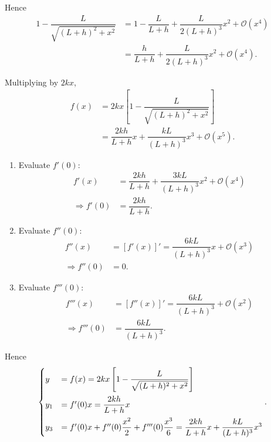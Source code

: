 \documentclass[12pt, a4paper]{report}
\begin{document}
	Hence
	\begin{align*}
		1 - \dfrac{L}{\sqrt{(L + h)^2 + x^2}} &= 1 - \dfrac{L}{L + h} + \dfrac{L}{2(L + h)^3}x^2 + \mathcal{O}(x^4) \\
		&= \dfrac{h}{L + h} + \dfrac{L}{2(L + h)^3}x^2 + \mathcal{O}(x^4).
	\end{align*}
	
	Multiplying by $2kx$,
	\begin{align}
		f(x) &= 2kx \left[ 1 - \dfrac{L}{\sqrt{(L + h)^2 + x^2}} \right] \\
		&= \dfrac{2kh}{L + h}x + \dfrac{kL}{(L + h)^3}x^3 + \mathcal{O}(x^5). \label{eq:problem2:fx_approx}
	\end{align}
	
	\begin{enumerate}[label=\textbf{Step \arabic*.}]
		\item Evaluate $f'(0)$:
		\begin{align}
			f'(x) &= \dfrac{2kh}{L + h} + \dfrac{3kL}{(L + h)^3}x^2 + \mathcal{O}(x^4) \\
			\Rightarrow f'(0) &= \dfrac{2kh}{L + h}. \label{eq:problem2:f_comma_0}
		\end{align}
		
		\item Evaluate $f''(0)$:
		\begin{align*}
			f''(x) &= \left[f'(x)\right]' = \dfrac{6kL}{(L + h)^3}x + \mathcal{O}(x^3) \\
			\Rightarrow f''(0) &= 0.
		\end{align*}
		
		\item Evaluate $f'''(0)$:
		\begin{align*}
			f'''(x) &= \left[f''(x)\right]' = \dfrac{6kL}{(L + h)^3} + \mathcal{O}(x^2) \\
			\Rightarrow f'''(0) &= \dfrac{6kL}{(L + h)^3}.
		\end{align*}
	\end{enumerate}
	
	Hence
	\begin{equation}
		\begin{cases}
			y &= f(x) = 2kx \left[1 - \dfrac{L}{\sqrt{(L + h)^2 + x^2}}\right] \vspace{5pt} \\
			y_1 &= f'(0)x = \dfrac{2kh}{L + h}x \vspace{5pt} \\
			y_3 &= f'(0)x + f''(0) \dfrac{x^2}{2} + f'''(0) \dfrac{x^3}{6} = \dfrac{2kh}{L + h}x + \dfrac{kL}{(L + h)^3}x^3 \label{eq:problem2:cases_of_taylor}
		\end{cases}.
	\end{equation}
	
\end{document}
